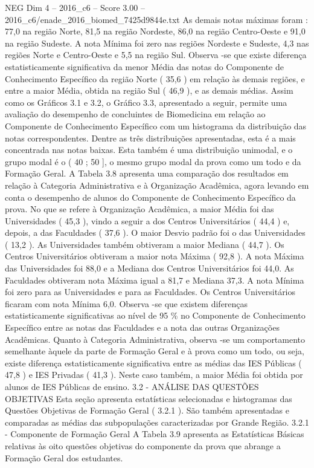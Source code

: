 \begin{textsample}{NEG Dim 4 – 2016\_c6 – Score 3.00 – 2016\_c6/enade\_2016\_biomed\_7425d9844e.txt}
As demais notas máximas foram : 77,0 na região Norte, 81,5 na região Nordeste, 86,0 na região Centro-Oeste e 91,0 na região Sudeste.
A nota Mínima foi zero nas regiões Nordeste e Sudeste, 4,3 nas regiões Norte e Centro-Oeste e 5,5 na região Sul.
Observa -se que existe diferença estatisticamente significativa da menor Média das notas do Componente de Conhecimento Específico da região Norte ( 35,6 ) em relação às demais regiões, e entre a maior Média, obtida na região Sul ( 46,9 ), e as demais médias.
Assim como os Gráficos 3.1 e 3.2, o Gráfico 3.3, apresentado a seguir, permite uma avaliação do desempenho de concluintes de Biomedicina em relação ao Componente de Conhecimento Específico com um histograma da distribuição das notas correspondentes.
Dentre as três distribuições apresentadas, esta é a mais concentrada nas notas baixas.
Esta também é uma distribuição unimodal, e o grupo modal é o ( 40 ; 50 ], o mesmo grupo modal da prova como um todo e da Formação Geral.
A Tabela 3.8 apresenta uma comparação dos resultados em relação à Categoria Administrativa e à Organização Acadêmica, agora levando em conta o desempenho de alunos do Componente de Conhecimento Específico da prova.
No que se refere à Organização Acadêmica, a maior Média foi das Universidades ( 45,3 ), vindo a seguir a dos Centros Universitários ( 44,4 ) e, depois, a das Faculdades ( 37,6 ).
O maior Desvio padrão foi o das Universidades ( 13,2 ).
As Universidades também obtiveram a maior Mediana ( 44,7 ).
Os Centros Universitários obtiveram a maior nota Máxima ( 92,8 ).
A nota Máxima das Universidades foi 88,0 e a Mediana dos Centros Universitários foi 44,0.
As Faculdades obtiveram nota Máxima igual a 81,7 e Mediana 37,3.
A nota Mínima foi zero para as Universidades e para as Faculdades.
Os Centros Universitários ficaram com nota Mínima 6,0.
Observa -se que existem diferenças estatisticamente significativas ao nível de 95 \% no Componente de Conhecimento Específico entre as notas das Faculdades e a nota das outras Organizações Acadêmicas.
Quanto à Categoria Administrativa, observa -se um comportamento semelhante àquele da parte de Formação Geral e à prova como um todo, ou seja, existe diferença estatisticamente significativa entre as médias das IES Públicas ( 47,8 ) e IES Privadas ( 41,3 ).
Neste caso também, a maior Média foi obtida por alunos de IES Públicas de ensino. 3.2 - ANÁLISE DAS QUESTÕES OBJETIVAS Esta seção apresenta estatísticas selecionadas e histogramas das Questões Objetivas de Formação Geral ( 3.2.1 ).
São também apresentadas e comparadas as médias das subpopulações caracterizadas por Grande Região. 3.2.1 - Componente de Formação Geral A Tabela 3.9 apresenta as Estatísticas Básicas relativas às oito questões objetivas do componente da prova que abrange a Formação Geral dos estudantes.

\end{textsample}
